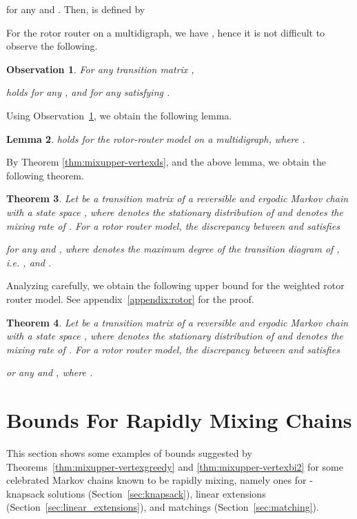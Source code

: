\documentclass[letter, 11pt]{article}
\newcommand{\1}{\mbox{1}\hspace{-0.25em}\mbox{l}}
\newtheorem{theorem}{Theorem}[section]
\newtheorem{lemma}[theorem]{Lemma}
\newtheorem{observation}[theorem]{Observation}
\begin{document}
 for any  and . 
Then,  is defined by 


 For the rotor router on a multidigraph, we have , hence
  it is not difficult to observe the following. 
\begin{observation}\label{bound:rotorz}
For any transition matrix , 

 holds for any , and for any  satisfying . 
\end{observation}
Using Observation~\ref{bound:rotorz}, we obtain the following lemma. 
\begin{lemma}\label{bound:rotor}
  holds for the rotor-router model on a multidigraph, where . 
\end{lemma}

 By Theorem \ref{thm:mixupper-vertexds}, and the above lemma, 
  we obtain the following theorem. 
\begin{theorem}
\label{thm:mixupper-vertexrr}
 Let  be a transition matrix of 
  a reversible and ergodic Markov chain with a state space , where  denotes the stationary distribution of  and  denotes the mixing rate of . 
  For a rotor router model, the discrepancy between  and  satisfies

for any  and , where  denotes the maximum degree of the transition diagram of , {\rm i.e.} , and . 
\end{theorem}
Analyzing carefully, we obtain the following upper bound for the weighted rotor router model. See appendix~\ref{appendix:rotor} for the proof.  
\begin{theorem}
\label{thm:mixupper-vertexrr2}
 Let  be a transition matrix of 
  a reversible and ergodic Markov chain with a state space , where  denotes the stationary distribution of  and  denotes the mixing rate of . 
  For a rotor router model, the discrepancy between  and  satisfies

or any  and , where . 
\end{theorem}


\section{Bounds For Rapidly Mixing Chains}\label{sec:applications}
This section shows some examples of 
   bounds suggested by Theorems~\ref{thm:mixupper-vertexgreedy} and \ref{thm:mixupper-vertexbi2} 
  for some celebrated Markov chains known to be rapidly mixing,  
   namely ones for - knapsack solutions (Section~\ref{sec:knapsack}), 
  linear extensions (Section~\ref{sec:linear_extensions}), and 
  matchings (Section~\ref{sec:matching}). 
\end{document}
